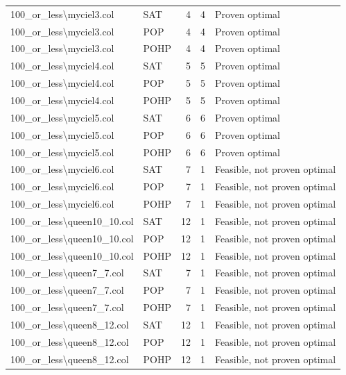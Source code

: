 \begin{longtable}{llrrl}
100\_or\_less\textbackslash{}myciel3.col & SAT & 4 & 4 & Proven optimal \\
100\_or\_less\textbackslash{}myciel3.col & POP & 4 & 4 & Proven optimal \\
100\_or\_less\textbackslash{}myciel3.col & POHP & 4 & 4 & Proven optimal \\
100\_or\_less\textbackslash{}myciel4.col & SAT & 5 & 5 & Proven optimal \\
100\_or\_less\textbackslash{}myciel4.col & POP & 5 & 5 & Proven optimal \\
100\_or\_less\textbackslash{}myciel4.col & POHP & 5 & 5 & Proven optimal \\
100\_or\_less\textbackslash{}myciel5.col & SAT & 6 & 6 & Proven optimal \\
100\_or\_less\textbackslash{}myciel5.col & POP & 6 & 6 & Proven optimal \\
100\_or\_less\textbackslash{}myciel5.col & POHP & 6 & 6 & Proven optimal \\
100\_or\_less\textbackslash{}myciel6.col & SAT & 7 & 1 & Feasible, not proven optimal \\
100\_or\_less\textbackslash{}myciel6.col & POP & 7 & 1 & Feasible, not proven optimal \\
100\_or\_less\textbackslash{}myciel6.col & POHP & 7 & 1 & Feasible, not proven optimal \\
100\_or\_less\textbackslash{}queen10\_10.col & SAT & 12 & 1 & Feasible, not proven optimal \\
100\_or\_less\textbackslash{}queen10\_10.col & POP & 12 & 1 & Feasible, not proven optimal \\
100\_or\_less\textbackslash{}queen10\_10.col & POHP & 12 & 1 & Feasible, not proven optimal \\
100\_or\_less\textbackslash{}queen7\_7.col & SAT & 7 & 1 & Feasible, not proven optimal \\
100\_or\_less\textbackslash{}queen7\_7.col & POP & 7 & 1 & Feasible, not proven optimal \\
100\_or\_less\textbackslash{}queen7\_7.col & POHP & 7 & 1 & Feasible, not proven optimal \\
100\_or\_less\textbackslash{}queen8\_12.col & SAT & 12 & 1 & Feasible, not proven optimal \\
100\_or\_less\textbackslash{}queen8\_12.col & POP & 12 & 1 & Feasible, not proven optimal \\
100\_or\_less\textbackslash{}queen8\_12.col & POHP & 12 & 1 & Feasible, not proven optimal \\

\end{longtable}
